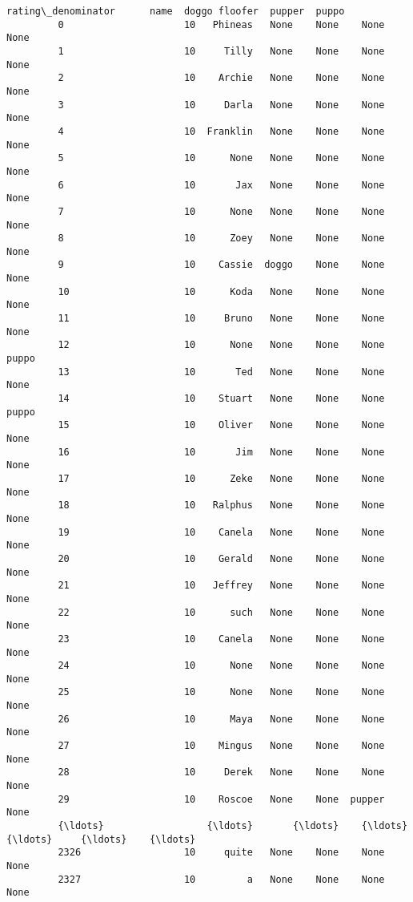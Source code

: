 \documentclass[11pt]{article}
\begin{document}
\begin{Verbatim}[commandchars=\\\{\}]
               rating\_denominator      name  doggo floofer  pupper  puppo  
         0                     10   Phineas   None    None    None   None  
         1                     10     Tilly   None    None    None   None  
         2                     10    Archie   None    None    None   None  
         3                     10     Darla   None    None    None   None  
         4                     10  Franklin   None    None    None   None  
         5                     10      None   None    None    None   None  
         6                     10       Jax   None    None    None   None  
         7                     10      None   None    None    None   None  
         8                     10      Zoey   None    None    None   None  
         9                     10    Cassie  doggo    None    None   None  
         10                    10      Koda   None    None    None   None  
         11                    10     Bruno   None    None    None   None  
         12                    10      None   None    None    None  puppo  
         13                    10       Ted   None    None    None   None  
         14                    10    Stuart   None    None    None  puppo  
         15                    10    Oliver   None    None    None   None  
         16                    10       Jim   None    None    None   None  
         17                    10      Zeke   None    None    None   None  
         18                    10   Ralphus   None    None    None   None  
         19                    10    Canela   None    None    None   None  
         20                    10    Gerald   None    None    None   None  
         21                    10   Jeffrey   None    None    None   None  
         22                    10      such   None    None    None   None  
         23                    10    Canela   None    None    None   None  
         24                    10      None   None    None    None   None  
         25                    10      None   None    None    None   None  
         26                    10      Maya   None    None    None   None  
         27                    10    Mingus   None    None    None   None  
         28                    10     Derek   None    None    None   None  
         29                    10    Roscoe   None    None  pupper   None  
         {\ldots}                  {\ldots}       {\ldots}    {\ldots}     {\ldots}     {\ldots}    {\ldots}  
         2326                  10     quite   None    None    None   None  
         2327                  10         a   None    None    None   None  

\end{Verbatim}
\end{document}
